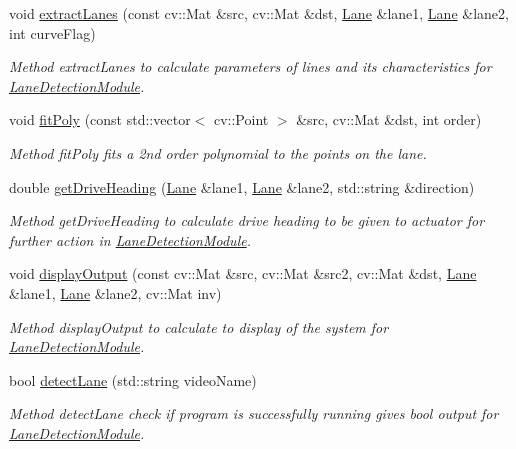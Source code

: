 \begin{DoxyCompactItemize}
void \hyperlink{classLaneDetectionModule_aac3d46f14bbdbdea78991e84beff383e}{extract\+Lanes} (const cv\+::\+Mat \&src, cv\+::\+Mat \&dst, \hyperlink{classLane}{Lane} \&lane1, \hyperlink{classLane}{Lane} \&lane2, int curve\+Flag)
\begin{DoxyCompactList}\small\item\em Method extract\+Lanes to calculate parameters of lines and its characteristics for \hyperlink{classLaneDetectionModule}{Lane\+Detection\+Module}. \end{DoxyCompactList}\item 
void \hyperlink{classLaneDetectionModule_a9b982428acc3a1e83503c6e079ae3a50}{fit\+Poly} (const std\+::vector$<$ cv\+::\+Point $>$ \&src, cv\+::\+Mat \&dst, int order)
\begin{DoxyCompactList}\small\item\em Method fit\+Poly fits a 2nd order polynomial to the points on the lane. \end{DoxyCompactList}\item 
double \hyperlink{classLaneDetectionModule_a5a3cfd88512d1ce1e5dc55aed8d47e5f}{get\+Drive\+Heading} (\hyperlink{classLane}{Lane} \&lane1, \hyperlink{classLane}{Lane} \&lane2, std\+::string \&direction)
\begin{DoxyCompactList}\small\item\em Method get\+Drive\+Heading to calculate drive heading to be given to actuator for further action in \hyperlink{classLaneDetectionModule}{Lane\+Detection\+Module}. \end{DoxyCompactList}\item 
void \hyperlink{classLaneDetectionModule_a12af439407512c538f983508d98cf1f3}{display\+Output} (const cv\+::\+Mat \&src, cv\+::\+Mat \&src2, cv\+::\+Mat \&dst, \hyperlink{classLane}{Lane} \&lane1, \hyperlink{classLane}{Lane} \&lane2, cv\+::\+Mat inv)
\begin{DoxyCompactList}\small\item\em Method display\+Output to calculate to display of the system for \hyperlink{classLaneDetectionModule}{Lane\+Detection\+Module}. \end{DoxyCompactList}\item 
bool \hyperlink{classLaneDetectionModule_a7b98ab6e8187993381f2c69b03ca76ef}{detect\+Lane} (std\+::string video\+Name)
\begin{DoxyCompactList}\small\item\em Method detect\+Lane check if program is successfully running gives bool output for \hyperlink{classLaneDetectionModule}{Lane\+Detection\+Module}. \end{DoxyCompactList}\item 

\end{DoxyCompactItemize}
